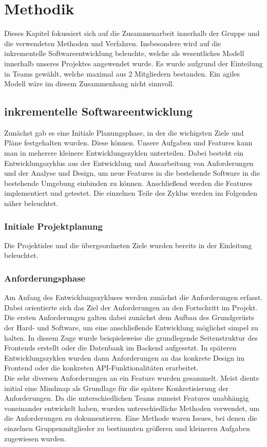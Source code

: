 \section{Methodik}
    Dieses Kapitel fokussiert sich auf die Zusammenarbeit innerhalb der Gruppe und die verwendeten Methoden und 
    Verfahren. Insbesondere wird auf die inkrementelle Softwareentwicklung beleuchte, welche als wesentliches 
    Modell innerhalb unseres Projektes angewendet wurde. Es wurde aufgrund der Einteilung in Teams gewählt, welche
    maximal aus 2 Mitgliedern bestanden. Ein agiles Modell wäre im diesem Zusammenhang nicht sinnvoll. 

    \subsection*{inkrementelle Softwareentwicklung} 
    Zunächst gab es eine Initiale Planungsphase, in der die wichigsten Ziele und Pläne festgehalten wurden. 
    Diese können. Unsere Aufgaben und Features kann man in meherere kleinere Entwicklungszyklen unterteilen. 
    Dabei besteht ein Entwicklungszyklus aus der Entwicklung und Ausarbeitung von Anforderungen und 
    der Analyse und Design, um neue Features in die bestehende Software in die bestehende Umgebung
    einbinden zu können. Anschließend werden die Features implementiert und getestet. 
    Die einzelnen Teile des Zyklus werden im Folgenden näher beleuchtet.
        \subsubsection*{Initiale Projektplanung}
        Die Projektidee und die übergeordneten Ziele wurden bereits in der Einleitung beleuchtet. 
        \subsubsection*{Anforderungsphase} 
        Am Anfang des Entwicklungszykluses werden zunächst die Anforderungen erfasst. Dabei orientierte 
        sich das Ziel der Anforderungen an den Fortschritt im Projekt. Die ersten Anforderungen galten dabei 
        zunächst dem Aufbau des Grundgerüsts der Hard- und Software, um eine anschließende Entwicklung
        möglichst simpel zu halten. In diesem Zuge wurde beispielsweise die grundlegende Seitenstruktur des 
        Frontends erstellt oder die Datenbank im Backend aufgesetzt. In späteren Entwicklungszyklen wurden 
        dann Anforderungen an das konkrete Design im Frontend oder die konkreten API-Funktionalitäten erarbeitet.\\
        Die sehr diversen Anforderungen an ein Feature wurden gesammelt. Meist diente initial eine Mindmap als 
        Grundlage für die spätere Konkretisierung der Anforderungen. Da die unterschiedlichen Teams zumeist 
        Features unabhängig voneinander entwickelt haben, wurden unterschiedliche Methoden verwendet, um die
        Anforderungen zu dokumentieren. Eine Methode waren Issues, bei denen die einzelnen Gruppenmitglieder 
        zu bestimmten größeren und kleineren Aufgaben zugewiesen wurden. 


